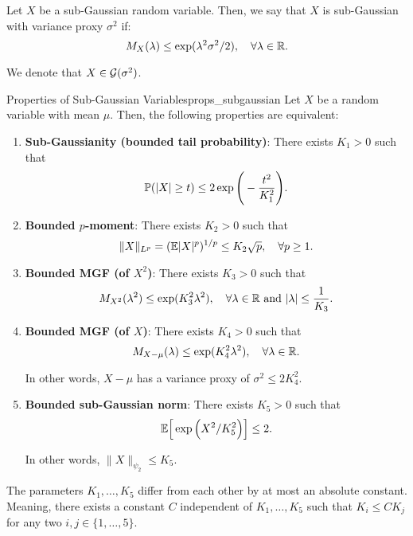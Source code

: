 \begin{definition}
	Let $X$ be a sub-Gaussian random variable. Then, we say that $X$ is sub-Gaussian with variance proxy $\sigma^2$ if:
	\begin{equation}
		M_X(\lambda) \le \exp(\lambda^2\sigma^2/2), \quad \forall \lambda\in\mathbb{R}.	
	\end{equation} 

	\noindent We denote that $X\in\mathcal{G}(\sigma^2)$.
\end{definition} 

\begin{proposition}{Properties of Sub-Gaussian Variables}{props_subgaussian}
	Let $X$ be a random variable with mean $\mu$. Then, the following properties are equivalent:

	\begin{enumerate}[label=(\roman*)]
		\item \textbf{Sub-Gaussianity (bounded tail probability)}: There exists $K_1>0$ such that
		\begin{equation}
			\mathbb{P}(|X| \ge t) \le 2\exp\Bigg( -\frac{t^2}{K_1^2} \Bigg).		
		\end{equation} 	

		\item \textbf{Bounded $p$-moment}: There exists $K_2>0$ such that
		\begin{equation}
			\|X\|_{L^p} = (\mathbb{E} |X|^p)^{1/p} \le K_2\sqrt{p}, \quad \forall p \ge 1.	
		\end{equation} 

		\item \textbf{Bounded MGF (of $X^2$)}: There exists $K_3>0$ such that
		\begin{equation}
			M_{X^2}(\lambda^2) \le \exp(K_3^2\lambda^2), \quad \forall \lambda\in\mathbb{R} \text{ and } |\lambda| \le \frac{1}{K_3}.	
		\end{equation} 

		\item \textbf{Bounded MGF (of $X$)}: There exists $K_4>0$ such that
		\begin{equation}
			M_{X-\mu}(\lambda) \le \exp(K_4^2\lambda^2), \quad \forall \lambda\in\mathbb{R}.
		\end{equation}

		\noindent In other words, $X-\mu$ has a variance proxy of $\sigma^2\le 2K_4^2$.

		\item \textbf{Bounded sub-Gaussian norm}: There exists $K_5>0$ such that
		\begin{equation}
			\mathbb{E}\Big[ \exp\Big( X^2/K_5^2 \Big) \Big]\le 2.
		\end{equation} 

		\noindent In other words, $\|X\|_{\psi_2}\le K_5$.
	\end{enumerate} 

	\noindent The parameters $K_1, \dots, K_5$ differ from each other by at most an absolute constant. Meaning, there exists a constant $C$ independent of $K_1, \dots, K_5$ such that $K_i \le C K_j$ for any two $i,j \in \{1, \dots, 5\}$.
\end{proposition} 